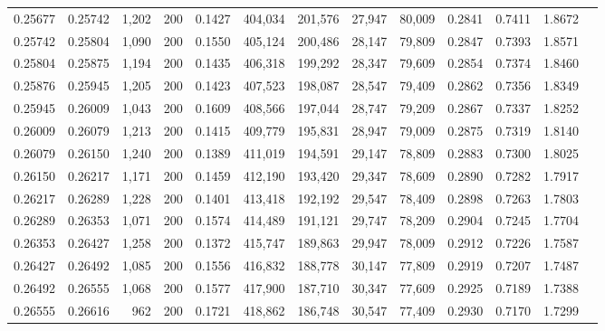 \begin{tabular}{rrrrrrrrrrrrr}
0.25677 & 0.25742 &  1,202 & 200 &                                     0.1427 & 404,034 & 201,576 &  27,947 &  80,009 & 0.2841 & 0.7411 & 1.8672 \\
0.25742 & 0.25804 &  1,090 & 200 &                                     0.1550 & 405,124 & 200,486 &  28,147 &  79,809 & 0.2847 & 0.7393 & 1.8571 \\
0.25804 & 0.25875 &  1,194 & 200 &                                     0.1435 & 406,318 & 199,292 &  28,347 &  79,609 & 0.2854 & 0.7374 & 1.8460 \\
0.25876 & 0.25945 &  1,205 & 200 &                                     0.1423 & 407,523 & 198,087 &  28,547 &  79,409 & 0.2862 & 0.7356 & 1.8349 \\
0.25945 & 0.26009 &  1,043 & 200 &                                     0.1609 & 408,566 & 197,044 &  28,747 &  79,209 & 0.2867 & 0.7337 & 1.8252 \\
0.26009 & 0.26079 &  1,213 & 200 &                                     0.1415 & 409,779 & 195,831 &  28,947 &  79,009 & 0.2875 & 0.7319 & 1.8140 \\
0.26079 & 0.26150 &  1,240 & 200 &                                     0.1389 & 411,019 & 194,591 &  29,147 &  78,809 & 0.2883 & 0.7300 & 1.8025 \\
0.26150 & 0.26217 &  1,171 & 200 &                                     0.1459 & 412,190 & 193,420 &  29,347 &  78,609 & 0.2890 & 0.7282 & 1.7917 \\
0.26217 & 0.26289 &  1,228 & 200 &                                     0.1401 & 413,418 & 192,192 &  29,547 &  78,409 & 0.2898 & 0.7263 & 1.7803 \\
0.26289 & 0.26353 &  1,071 & 200 &                                     0.1574 & 414,489 & 191,121 &  29,747 &  78,209 & 0.2904 & 0.7245 & 1.7704 \\
0.26353 & 0.26427 &  1,258 & 200 &                                     0.1372 & 415,747 & 189,863 &  29,947 &  78,009 & 0.2912 & 0.7226 & 1.7587 \\
0.26427 & 0.26492 &  1,085 & 200 &                                     0.1556 & 416,832 & 188,778 &  30,147 &  77,809 & 0.2919 & 0.7207 & 1.7487 \\
0.26492 & 0.26555 &  1,068 & 200 &                                     0.1577 & 417,900 & 187,710 &  30,347 &  77,609 & 0.2925 & 0.7189 & 1.7388 \\
0.26555 & 0.26616 &    962 & 200 &                                     0.1721 & 418,862 & 186,748 &  30,547 &  77,409 & 0.2930 & 0.7170 & 1.7299 \\

\end{tabular}

